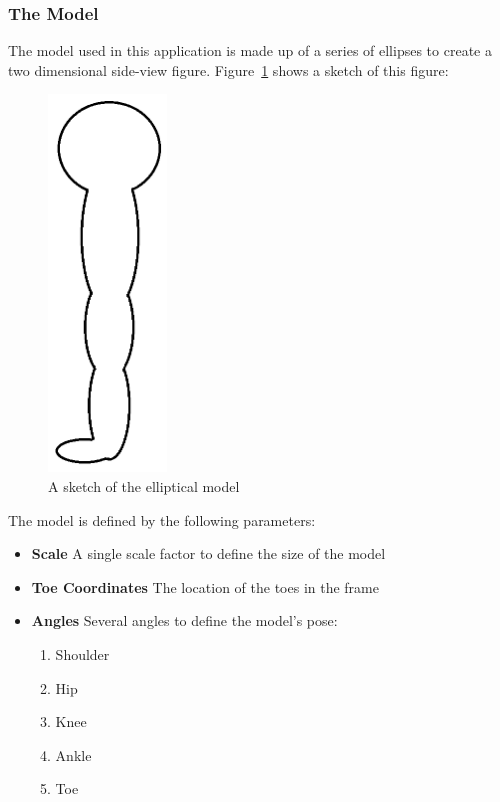 \subsubsection{The Model}
\label{subsec:model}

The model used in this application is made up of a series of ellipses to create a two dimensional side-view figure. Figure~\ref{fig:modelellipses} shows a sketch of this figure:

\begin{figure}[H]
    \centering
	\includegraphics[height=10cm]{algorithm/images/model}
\caption{A sketch of the elliptical model}
\label{fig:modelellipses}
\end{figure}

The model is defined by the following parameters:

\begin{itemize}
	\item \textbf{Scale} A single scale factor to define the size of the model
	\item \textbf{Toe Coordinates} The location of the toes in the frame
	\item \textbf{Angles} Several angles to define the model's pose:
		\begin{enumerate}
			\item Shoulder
			\item Hip
			\item Knee
			\item Ankle
			\item Toe
		\end{enumerate}
\end{itemize}

